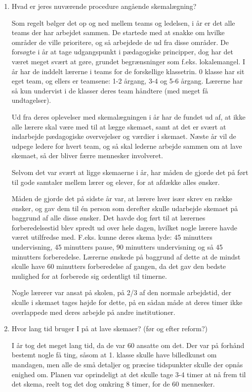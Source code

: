 \begin{enumerate}
	\item Hvad er jeres nuværende procedure angående skemalægning?

	Som regelt bølger det op og ned mellem teams og ledelsen, i år er det alle teams der har arbejdet sammen. De startede med at snakke om hvilke områder de ville prioritere, og så arbejdede de ud fra disse områder. De forsøgte i år at tage udgangspunkt i pædagogiske principper, dog har det været meget svært at gøre, grundet begrænsninger som f.eks. lokalemangel. I år har de inddelt lærerne i teams for de forskellige klassetrin. 0 klasse har sit eget team, og ellers er teamsene: 1-2 årgang, 3-4 og 5-6 årgang. Lærerne har så kun undervist i de klasser deres team håndtere (med meget få undtagelser).

	Ud fra deres oplevelser med skemalægningen i år har de fundet ud af, at ikke alle lærere skal være med til at lægge skemaet, samt at det er svært at indarbejde pædagogiske overvejelser og værdier i skemaet. Næste år vil de udpege ledere for hvert team, og så skal lederne arbejde sammen om at lave skemaet, så der bliver færre mennesker involveret.

	Selvom det var svært at ligge skemaerne i år, har måden de gjorde det på ført til gode samtaler mellem lærer og elever, for at afdække alles ønsker.

	Måden de gjorde det på sidste år var, at lærere hver især skrev en række ønsker, og gav dem til \'en person som derefter skulle udarbejde skemaet på baggrund af alle disse ønsker. Det havde dog ført til at lærernes forberedelsestid blev spredt ud over hele dagen, hvilket nogle lærere havde været utilfredse med. F.eks. kunne deres skema lyde: 45 minutters undervisning, 45 minutters pause, 90 minutters undervisning og så 45 minutters forberedelse. Lærerne ønskede på baggrund af dette at de mindst skulle have 60 minutters forberedelse af gangen, da det gav den bedste mulighed for at forberede sig ordentligt til timerne.

	Nogle lærerer var ansat på skolen, på 2/3 af den normale arbejdstid, der skulle i skemaet tages højde for dette, på en sådan måde at deres timer ikke overlappede med deres arbejde på andre institutioner.

	
	\item Hvor lang tid bruger I på at lave skemaer? (før og efter reform?)

	I år tog det meget lang tid, da de var 60 ansatte om det. Der var på forhånd bestemt nogle få ting, såsom at 1. klasse skulle have billedkunst om mandagen, men alle de små detaljer og præcise tidspunkter skulle der opnås enighed om. Planen var oprindeligt at det skulle tage 3-4 timer at nå frem til det skema, reelt tog det dog omkring 8 timer, for de 60 mennesker. 


\end{enumerate}
